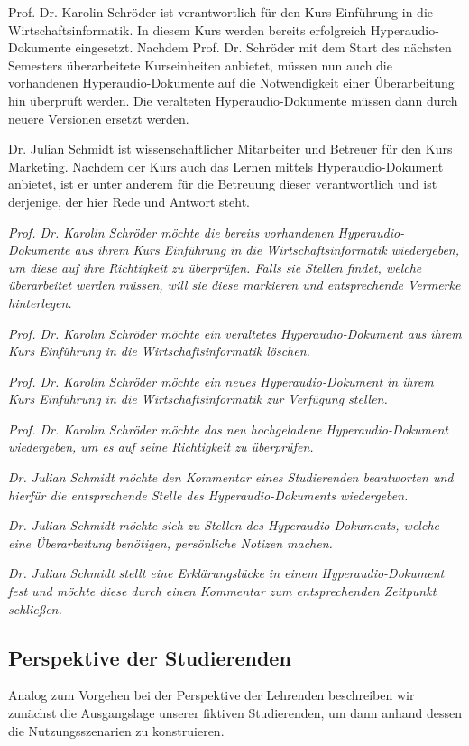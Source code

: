 Prof. Dr. Karolin Schröder ist verantwortlich für den Kurs \glqq Einführung in die Wirtschaftsinformatik\grqq{}. In diesem Kurs werden bereits erfolgreich Hyperaudio-Dokumente eingesetzt. Nachdem Prof. Dr. Schröder mit dem Start des nächsten Semesters überarbeitete Kurseinheiten anbietet, müssen nun auch die vorhandenen Hyperaudio-Dokumente auf die Notwendigkeit einer Überarbeitung hin überprüft werden. Die veralteten Hyperaudio-Dokumente müssen dann durch neuere Versionen ersetzt werden.

Dr. Julian Schmidt ist wissenschaftlicher Mitarbeiter und Betreuer für den Kurs \glqq Marketing\grqq{}. Nachdem der Kurs auch das Lernen mittels Hyperaudio-Dokument anbietet, ist er unter anderem für die Betreuung dieser verantwortlich und ist derjenige, der hier Rede und Antwort steht.

\textit{Prof. Dr. Karolin Schröder möchte die bereits vorhandenen Hyperaudio-Dokumente aus ihrem Kurs \glqq Einführung in die Wirtschaftsinformatik\grqq{} wiedergeben, um diese auf ihre Richtigkeit zu überprüfen. Falls sie Stellen findet, welche überarbeitet werden müssen, will sie diese markieren und entsprechende Vermerke hinterlegen.}

\textit{Prof. Dr. Karolin Schröder möchte ein veraltetes Hyperaudio-Dokument aus ihrem Kurs \glqq Einführung in die Wirtschaftsinformatik\grqq{} löschen.}

\textit{Prof. Dr. Karolin Schröder möchte ein neues Hyperaudio-Dokument in ihrem Kurs \glqq Einführung in die Wirtschaftsinformatik\grqq{} zur Verfügung stellen.}

\textit{Prof. Dr. Karolin Schröder möchte das neu hochgeladene Hyperaudio-Dokument wiedergeben, um es auf seine Richtigkeit zu überprüfen.}

\textit{Dr. Julian Schmidt möchte den Kommentar eines Studierenden beantworten und hierfür die entsprechende Stelle des Hyperaudio-Dokuments wiedergeben.}

\textit{Dr. Julian Schmidt möchte sich zu Stellen des Hyperaudio-Dokuments, welche eine Überarbeitung benötigen, persönliche Notizen machen.}

\textit{Dr. Julian Schmidt stellt eine Erklärungslücke in einem Hyperaudio-Dokument fest und möchte diese durch einen Kommentar zum entsprechenden Zeitpunkt schließen.}

\subsection{Perspektive der Studierenden}
Analog zum Vorgehen bei der Perspektive der Lehrenden beschreiben wir zunächst die Ausgangslage unserer fiktiven Studierenden, um dann anhand dessen die Nutzungsszenarien zu konstruieren.

